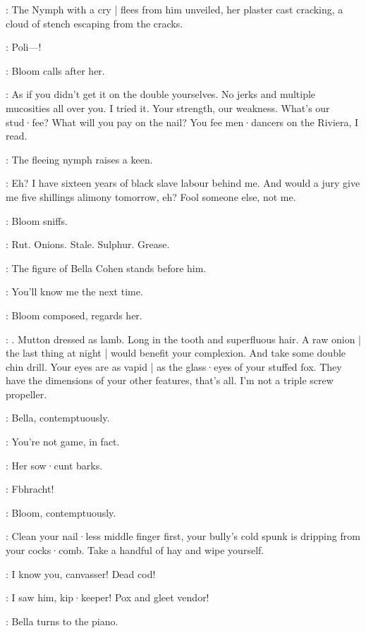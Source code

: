 :
The Nymph with a cry |
flees from him unveiled,
her plaster cast cracking,
a cloud of stench escaping from the cracks.

\Nymph:
Poli---!

:
Bloom calls after her.

\Bloom:
As if you didn't get it on the double yourselves.
No jerks and multiple mucosities all over you.
I tried it.
Your strength,
our weakness.
What's our stud·fee?
What will you pay on the nail?
You fee men·dancers on the Riviera,
I read.

:
The fleeing nymph raises a keen.

\Bloom:
Eh?
I have sixteen years of black slave labour behind me.
And would a jury give me five shillings alimony tomorrow,
eh?
Fool someone else,
not me.

:
Bloom sniffs.

\Bloom:
Rut.
Onions.
Stale.
Sulphur.
Grease.


:
The figure of Bella Cohen stands before him.

\Bella:
You'll know me the next time.

:
Bloom composed,
regards her.

\Bloom:
.
Mutton dressed as lamb.
Long in the tooth and superfluous hair.
A raw onion |
the last thing at night |
would benefit your complexion.
And take some double chin drill.
Your eyes are as vapid |
as the glass·eyes of your stuffed fox.
They have the dimensions of your other features,
that's all.
I'm not a triple screw propeller.

:
Bella,
contemptuously.

\Bella:
You're not game,
in fact.

:
Her sow·cunt barks.

\Bella:
Fbhracht!%

:
Bloom,
contemptuously.

\Bloom:
Clean your nail·less middle finger first,
your bully's cold spunk is dripping from your cocks·comb.
Take a handful of hay and wipe yourself.

\Bella:
I know you,
canvasser!
Dead cod!

\Bloom:
I saw him,
kip·keeper!
Pox and gleet vendor!

:
Bella turns to the piano.

